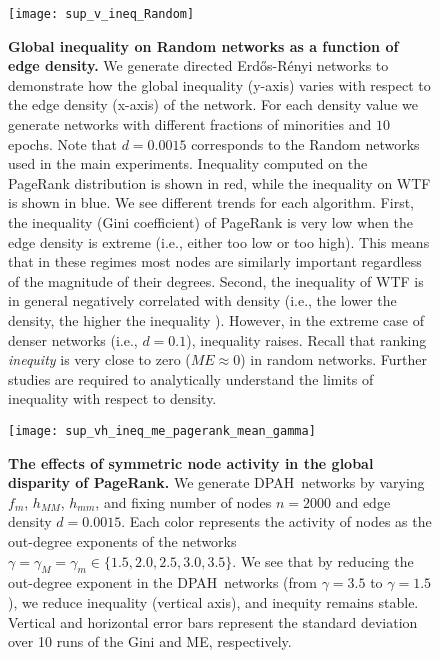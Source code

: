 \documentclass[fleqn,10pt]{wlscirep}
\begin{document}
\begin{figure}[h!]
    \centering
    \texttt{[image: sup\_v\_ineq\_Random]}
    \caption{\textbf{Global inequality on Random networks as a function of edge density.} We generate directed Erd\H{o}s-R\'{e}nyi networks to demonstrate how the global inequality (y-axis) varies with respect to the edge density (x-axis) of the network. 
    For each density value we generate networks with different fractions of minorities and $10$ epochs. 
    Note that $d=0.0015$ corresponds to the Random networks used in the main experiments.
    Inequality computed on the PageRank distribution is shown in red, while the inequality on WTF is shown in blue.
    We see different trends for each algorithm. First, the inequality (Gini coefficient) of PageRank is very low when the edge density is extreme (i.e., either too low or too high). This means that in these regimes most nodes are similarly important regardless of the magnitude of their degrees.
    Second, the inequality of WTF is in general negatively correlated with density (i.e., the lower the density, the higher the inequality \cite{goswami2018sparsity}). However, in the extreme case of denser networks (i.e., $d=0.1$), inequality raises.
    Recall that ranking \textit{inequity} is very close to zero ($ME\approx0$) in random networks. 
    Further studies are required to analytically understand the limits of inequality with respect to density.}
    \label{sm:v_density}
\end{figure}

\begin{figure}[ht]
    \centering
    \texttt{[image: sup\_vh\_ineq\_me\_pagerank\_mean\_gamma]}
    \caption{\textbf{The effects of symmetric node activity in the global disparity of PageRank.} 
    We generate {DPAH}~networks by varying $f_m$, $h_{MM}$, $h_{mm}$, and fixing number of nodes $n=2000$ and edge density $d=0.0015$.
    Each color represents the activity of nodes as the out-degree exponents of the networks $\gamma=\gamma_M=\gamma_m\in\{1.5, 2.0, 2.5, 3.0, 3.5\}$.
    We see that by reducing the out-degree exponent in the {DPAH}~networks (from $\gamma=3.5$ to $\gamma=1.5$), we reduce inequality (vertical axis), and inequity remains stable. 
    Vertical and horizontal error bars represent the standard deviation over 10 runs of the Gini and ME, respectively.}
    \label{sm:vh_pr}
\end{figure}
\end{document}
